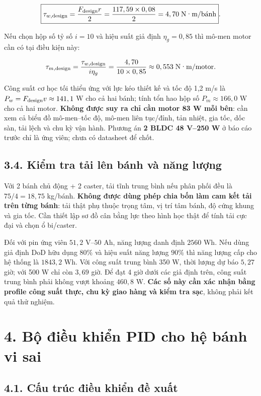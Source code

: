\documentclass[
  12pt,
  a4paper,
]{article}
\begin{document}
\[
\boxed{\tau_{w,\rm design} =\frac{F_{\rm design}r}{2}
=\frac{117,59\times0,08}{2}=4,70\;\text{N·m/bánh}}.
\]

Nếu chọn hộp số tỷ số \(i=10\) và hiệu suất giả định \(\eta_g=0,85\) thì
mô-men motor cần có tại điều kiện này:

\[
\tau_{m,\rm design}=\frac{\tau_{w,\rm design}}{i\eta_g}
=\frac{4,70}{10\times0,85}\approx0,553\;\text{N·m/motor}.
\]

Công suất cơ học tối thiểu ứng với lực kéo thiết kế và tốc độ 1,2 m/s là
\(P_{w}=F_{\rm design}v\approx141,1\) W cho cả hai bánh; tính tổn hao
hộp số \(P_m\approx166,0\) W cho cả hai motor. \textbf{Không được suy ra
chỉ cần motor 83 W mỗi bên}: cần xem cả biểu đồ mô-men--tốc độ, mô-men
liên tục/đỉnh, tản nhiệt, gia tốc, dốc sàn, tải lệch và chu kỳ vận hành.
Phương án \textbf{2 BLDC 48 V--250 W} ở báo cáo trước chỉ là ứng viên;
chưa có datasheet để chốt.

\subsection{3.4. Kiểm tra tải lên bánh và năng
lượng}\label{kiux1ec3m-tra-tux1ea3i-luxean-buxe1nh-vuxe0-nux103ng-lux1b0ux1ee3ng}

Với 2 bánh chủ động + 2 caster, tải tĩnh trung bình nếu phân phối đều là
\(75/4=18,75\) kg/bánh. \textbf{Không được dùng phép chia bốn làm cam
kết tải trên từng bánh}: tải thật phụ thuộc trọng tâm, vị trí tâm bánh,
độ cứng khung và gia tốc. Cần thiết lập sơ đồ cân bằng lực theo hình học
thật để tính tải cực đại và chọn ổ bi/caster.

Đối với pin ứng viên \(51,2\) V--\(50\) Ah, năng lượng danh định
\(2560\) Wh. Nếu dùng giả định DoD hữu dụng \(80\%\) và hiệu suất năng
lượng \(90\%\) thì năng lượng cấp cho hệ thống là \(1843,2\) Wh. Với
công suất trung bình 350 W, thời lượng dự báo \(5,27\) giờ; với 500 W
chỉ còn \(3,69\) giờ. Để đạt 4 giờ dưới các giả định trên, công suất
trung bình phải không vượt khoảng \(460,8\) W. \textbf{Các số này cần
xác nhận bằng profile công suất thực, chu kỳ giao hàng và kiểm tra sạc},
không phải kết quả thử nghiệm.

\section{4. Bộ điều khiển PID cho hệ bánh vi
sai}\label{bux1ed9-ux111iux1ec1u-khiux1ec3n-pid-cho-hux1ec7-buxe1nh-vi-sai}

\subsection{4.1. Cấu trúc điều khiển đề
xuất}\label{cux1ea5u-truxfac-ux111iux1ec1u-khiux1ec3n-ux111ux1ec1-xuux1ea5t}
\end{document}
